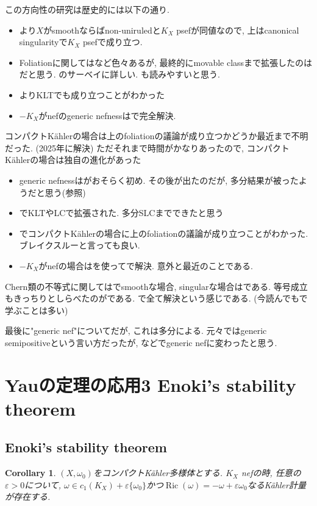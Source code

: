 \documentclass[dvipdfmx,a4paper,11pt]{article} %
\newtheorem{cor}[thm]{Corollary}
\theoremstyle{definition}
\theoremstyle{remark}
\numberwithin{equation}{section}
\DeclareMathOperator{\Ric}{Ric}
\begin{document}
この方向性の研究は歴史的には以下の通り.
\begin{itemize}
\item \cite{BDPP13}より$X$がsmoothならばnon-uniruledと$K_X$ psefが同値なので, 上はcanonical singularityで$K_X$ psefで成り立つ. 
\item Foliationに関しては\cite{BM16, KST07}など色々あるが, 最終的にmovable classまで拡張したのは\cite{CP19}だと思う. \cite{Cla16}のサーベイに詳しい. \cite{Lazicnote}も読みやすいと思う. 
\item \cite{CKT21}よりKLTでも成り立つことがわかった
\item $-K_X$がnefのgeneric nefnessは\cite{Ou23}で完全解決. 
\end{itemize}

 コンパクトK\"ahlerの場合は上のfoliationの議論が成り立つかどうか最近まで不明だった. (2025年に解決) ただそれまで時間がかなりあったので, コンパクトK\"ahlerの場合は独自の進化があった
\begin{itemize}
\item generic nefnessは\cite{Eno88}がおそらく初め. その後\cite{Cao13}が出たのだが, 多分結果が被ったようだと思う(\cite[Remark 2]{Cao13}参照)
\item \cite{Gue16}でKLTやLCで拡張された. 多分SLCまでできたと思う
\item  \cite{Ou25}でコンパクトK\"ahlerの場合に上のfoliationの議論が成り立つことがわかった. ブレイクスルーと言っても良い. 
\item $-K_X$がnefの場合は\cite{Ou25}を使って\cite{IJZ25, MWWZ25, FGSW26}で解決. 意外と最近のことである. 
\end{itemize}

Chern類の不等式に関しては\cite{Miy87, Cao13, Ou23, IM22}でsmoothな場合, singularな場合は\cite{IMM24}である.
等号成立もきっちりとしらべたのが\cite{Cao13, Ou23, IM22, IMM24}である. \cite{IMM24}で全て解決という感じである. (今読んでも\cite{Miy87, Cao13, Ou23}で学ぶことは多い)

最後に"generic nef"についてだが, これは多分\cite{Pet12}による. 元々\cite{Miy87,Eno88}ではgeneric semipositiveという言い方だったが, \cite{Ou23}などでgeneric nefに変わったと思う. 

 
 \newpage
  \section{Yauの定理の応用3 Enoki's  stability theorem}
 
 \subsection{Enoki's stability theorem}
\begin{cor}
\label{cor-Yau-thm-3}
$(X, \omega_0)$をコンパクトK\"ahler多様体とする. 
$K_X$ nefの時, 任意の$\varepsilon>0$について, $\omega \in c_1(K_X) + \varepsilon\{\omega_0\}$かつ$\Ric(\omega) = -\omega + \varepsilon \omega_0$なるK\"ahler計量が存在する. 
\end{cor}
\end{document}
